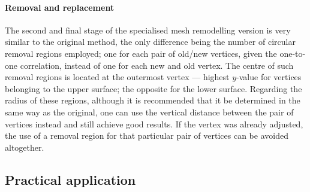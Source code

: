 \paragraph{Removal and replacement} The second and final stage of the specialised mesh remodelling version is very similar to the original method, the only difference being the number of circular removal regions employed; one for each pair of old/new vertices, given the one-to-one correlation, instead of one for each new and old vertex. The centre of such removal regions is located at the outermost vertex --- highest $y$-value for vertices belonging to the upper surface; the opposite for the lower surface. Regarding the radius of these regions, although it is recommended that it be determined in the same way as the original, one can use the vertical distance between the pair of vertices instead and still achieve good results. If the vertex was already adjusted, the use of a removal region for that particular pair of vertices can be avoided altogether.


\subsection{Practical application}

